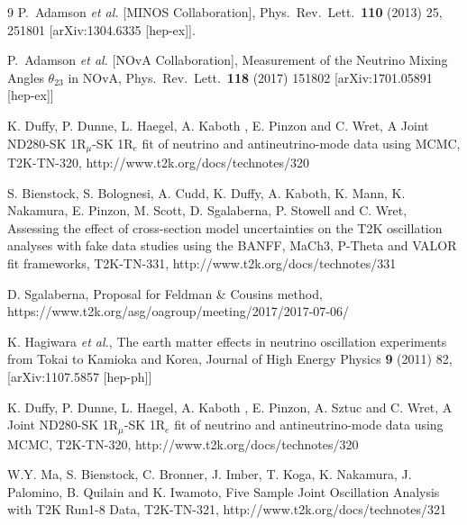 \begin{thebibliography}{9}
  P.~Adamson {\it et al.}  [MINOS Collaboration],
  Phys.\ Rev.\ Lett.\  {\bf 110} (2013) 25,  251801
  [arXiv:1304.6335 [hep-ex]].

  P.~Adamson {\it et al.}  [NOvA Collaboration],
  Measurement of the Neutrino Mixing Angles $\theta_{23}$ in NOvA,
  Phys.\ Rev.\ Lett.\ {\bf 118} (2017) 151802
  [arXiv:1701.05891 [hep-ex]]

   K. Duffy, P. Dunne, L. Haegel, A. Kaboth , E. Pinzon and C. Wret,
   A Joint ND280-SK 1R$_\mu$-SK 1R$_e$ fit of neutrino and antineutrino-mode data using MCMC,
   T2K-TN-320,
   http://www.t2k.org/docs/technotes/320

   S. Bienstock, S. Bolognesi, A. Cudd, K. Duffy, A. Kaboth, K. Mann, K. Nakamura, E. Pinzon, M. Scott, D. Sgalaberna, P. Stowell and C. Wret,
   Assessing the effect of cross-section model uncertainties on the T2K oscillation analyses with fake data studies using the BANFF, MaCh3, P-Theta and VALOR fit frameworks,
   T2K-TN-331,
   http://www.t2k.org/docs/technotes/331

   D. Sgalaberna,
   Proposal for Feldman \& Cousins method,
   https://www.t2k.org/asg/oagroup/meeting/2017/2017-07-06/

   K. Hagiwara {\it et al.},
   The earth matter effects in neutrino oscillation experiments from Tokai to Kamioka and Korea,
   Journal of High Energy Physics {\bf 9} (2011) 82,
   [arXiv:1107.5857 [hep-ph]]

   K. Duffy, P. Dunne, L. Haegel, A. Kaboth , E. Pinzon, A. Sztuc and C. Wret,
   A Joint ND280-SK 1R$_\mu$-SK 1R$_e$ fit of neutrino and antineutrino-mode data using MCMC,
   T2K-TN-320,
   http://www.t2k.org/docs/technotes/320

   W.Y. Ma, S. Bienstock, C. Bronner, J. Imber, T. Koga, K. Nakamura, J. Palomino, B. Quilain and K. Iwamoto,
   Five Sample Joint Oscillation Analysis with T2K Run1-8 Data,
   T2K-TN-321,
   http://www.t2k.org/docs/technotes/321

\end{thebibliography}



